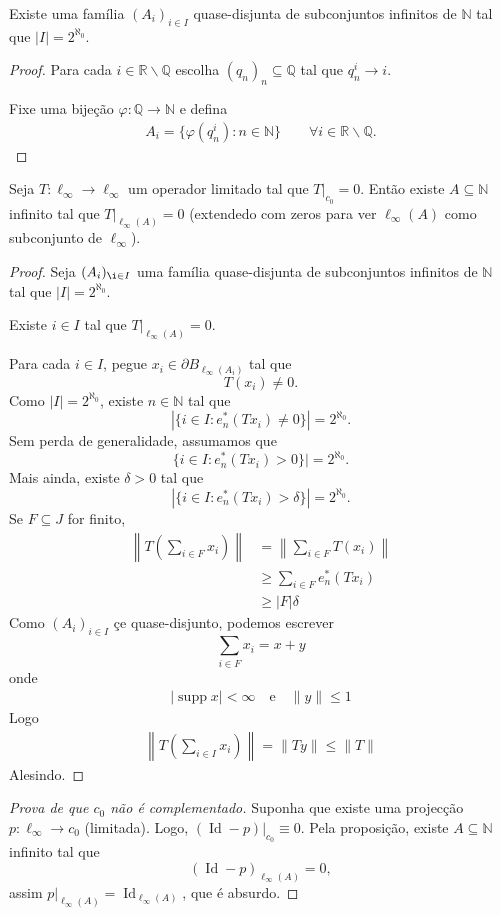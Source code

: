 \documentclass[portuguese]{article}
\theoremstyle{definition}
\newcommand{\R}{\mathbb{R}}
\newcommand{\N}{\mathbb{N}}
\newcommand{\Q}{\mathbb{Q}}
\DeclareMathOperator{\Id}{Id}
\begin{document}
\begin{prop}
	Existe uma família $(A_i)_{i\in I}$ quase-disjunta de subconjuntos infinitos de $\N$ tal que $|I|=2^{\aleph_0}$.
\end{prop}
\begin{proof}
	Para cada $i\in\R\backslash\Q$ escolha $(q_n)_n\subseteq \Q$ tal que $q_n^i\to i$.
	
	Fixe uma bijeção $\varphi:\Q\to\N$ e defina
	\begin{align*}
		A_i=\{\varphi(q^i_n):n\in\N\}\qquad\forall i\in\R\backslash\Q.
	\end{align*}
\end{proof}

\begin{prop}
	Seja $T:\ell_\infty\to\ell_\infty$ um operador limitado tal que $T|_{c_0}=0$. Então existe $A\subseteq\N$ infinito tal que $T|_{\ell_\infty(A)}=0$ (extendedo com zeros para ver $\ell_\infty(A)$ como subconjunto de $\ell_\infty$).
\end{prop}
\begin{proof}
	Seja $(A_i)_{\i\in I}$ uma família quase-disjunta de subconjuntos infinitos de $\N$ tal que $|I|=2^{\aleph_0}$.
	\begin{af*}
		Existe $i\in I$ tal que $T|_{\ell_\infty(A)}=0$.
	\end{af*}
	Para cada $i\in I$, pegue $x_i\in\partial B_{\ell_\infty(A_i)}$ tal que
	\[T(x_i)\neq0.\]
	Como $|I|=2^{\aleph_0}$, existe $n\in\N$ tal que
	\[|\{i\in I:e^*_n(Tx_i)\neq0\}|=2^{\aleph_0}.\]
	Sem perda de generalidade, assumamos que
	\[\{i\in I:e^*_n(Tx_i)>0\}|=2^{\aleph_0}.\]
	Mais ainda, existe $\delta>0$ tal que
	\[|\{i\in I:e^*_n(Tx_i)>\delta\}|=2^{\aleph_0}.\]
	Se $F\subseteq J$ for finito,
	\begin{align*}
		\left\|T\left(\sum_{i\in F}x_i\right)\right\|&=\left\|\sum_{i\in F}T(x_i)\right\|\\
	&\geq\sum_{i\in F}e^*_n(Tx_i)\\
	&\geq |F|\delta
	\end{align*}
	Como $(A_i)_{i\in I}$ çe quase-disjunto, podemos escrever
	\[\sum_{i\in F}x_i=x+y\]
	onde 
	\begin{align*}
		|\operatorname{supp}x|<\infty\quad\text{e}\quad\|y\|\leq1
	\end{align*}
	Logo
	\begin{align*}
		\left\|T\left(\sum_{i\in I}x_i\right)\right\|=\|Ty\|\leq\|T\|
	\end{align*}
	Alesindo.
\end{proof}
\begin{proof}[Prova de que $c_0$ não é complementado]
	Suponha que existe uma projecção $p:\ell_\infty\to c_0$ (limitada). Logo, $(\Id-p)|_{c_0}\equiv0$. Pela proposição, existe $A\subseteq\N$ infinito tal que
	\[(\Id-p)_{\ell_\infty(A)}=0,\]
	assim $p|_{\ell_\infty(A)}=\Id_{\ell_\infty(A)}$, que é absurdo.
\end{proof}
\end{document}
